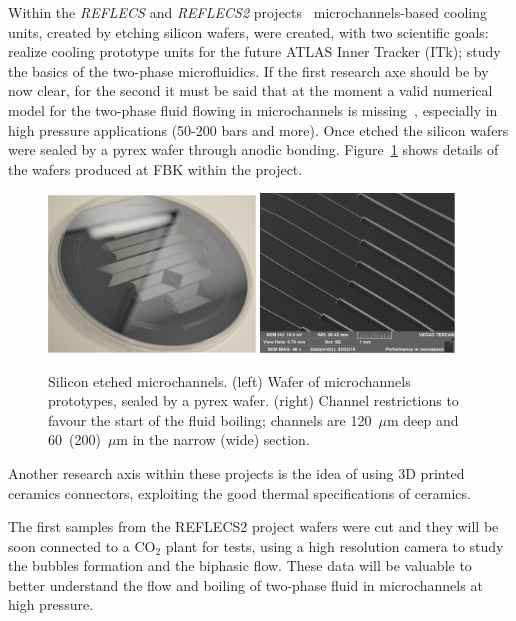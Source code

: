 Within the {\it REFLECS} and {\it REFLECS2} projects~\cite{REFLECS} microchannels-based cooling units, 
created by etching silicon wafers, were created, with two scientific goals: realize cooling prototype units 
for the future ATLAS Inner Tracker (ITk); study the basics of the two-phase microfluidics. If the first research 
axe should be by now clear, for the second it must be said that at the moment a valid numerical model for 
the two-phase fluid flowing in microchannels is missing~\cite{KIM201474}, especially in high pressure applications (50-200 
bars and more).
Once etched the silicon wafers were sealed by a pyrex wafer through anodic bonding. 
Figure~\ref{fig:reflecs} shows details of the wafers produced at FBK within the project. 
\begin{figure}[!htpb]
\centering
\includegraphics[width=0.49\textwidth]{Wafer.pdf}
\includegraphics[width=0.46\textwidth]{restrictions.pdf}
\caption{\label{fig:reflecs}Silicon etched microchannels. (left) Wafer of microchannels prototypes, 
sealed by a pyrex wafer. (right) Channel restrictions to favour the start of the fluid boiling; channels are 
120~$\mu$m deep and 60~(200)~$\mu$m in the narrow (wide) section.}
\end{figure}
Another research axis within these projects is the idea of using 3D printed ceramics connectors, 
exploiting the good thermal specifications of ceramics. 

The first samples from the REFLECS2 project wafers were cut and they will be soon connected 
to a CO$_2$ plant for tests, using a high resolution camera to study the bubbles formation and the 
biphasic flow. These data will be valuable to better understand the flow and boiling of two-phase fluid 
in microchannels at high pressure. 

